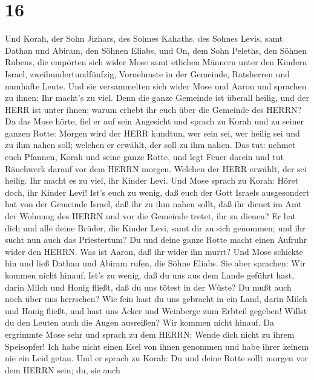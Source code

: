 \hypertarget{section-15}{%
\section{16}\label{section-15}}

 Und Korah, der Sohn Jizhars, des Sohnes Kahaths, des Sohnes
Levis, samt Dathan und Abiram, den Söhnen Eliabs, und On, dem Sohn
Peleths, den Söhnen Rubens,  die empörten sich wider Mose
samt etlichen Männern unter den Kindern Israel, zweihundertundfünfzig,
Vornehmste in der Gemeinde, Ratsherren und namhafte Leute. 
Und sie versammelten sich wider Mose und Aaron und sprachen zu ihnen:
Ihr macht's zu viel. Denn die ganze Gemeinde ist überall heilig, und der
HERR ist unter ihnen; warum erhebt ihr euch über die Gemeinde des HERRN?
 Da das Mose hörte, fiel er auf sein Angesicht 
und sprach zu Korah und zu seiner ganzen Rotte: Morgen wird der HERR
kundtun, wer sein sei, wer heilig sei und zu ihm nahen soll; welchen er
erwählt, der soll zu ihm nahen.  Das tut: nehmet euch
Pfannen, Korah und seine ganze Rotte,  und legt Feuer darein
und tut Räuchwerk darauf vor dem HERRN morgen. Welchen der HERR erwählt,
der sei heilig. Ihr macht es zu viel, ihr Kinder Levi.  Und
Mose sprach zu Korah: Höret doch, ihr Kinder Levi!  Ist's
euch zu wenig, daß euch der Gott Israels ausgesondert hat von der
Gemeinde Israel, daß ihr zu ihm nahen sollt, daß ihr dienet im Amt der
Wohnung des HERRN und vor die Gemeinde tretet, ihr zu dienen?
 Er hat dich und alle deine Brüder, die Kinder Levi, samt
dir zu sich genommen; und ihr sucht nun auch das Priestertum?
 Du und deine ganze Rotte macht einen Aufruhr wider den
HERRN. Was ist Aaron, daß ihr wider ihn murrt?  Und Mose
schickte hin und ließ Dathan und Abiram rufen, die Söhne Eliabs. Sie
aber sprachen: Wir kommen nicht hinauf.  Ist's zu wenig,
daß du uns aus dem Lande geführt hast, darin Milch und Honig fließt, daß
du uns tötest in der Wüste? Du mußt auch noch über uns herrschen?
 Wie fein hast du uns gebracht in ein Land, darin Milch und
Honig fließt, und hast uns Äcker und Weinberge zum Erbteil gegeben!
Willst du den Leuten auch die Augen ausreißen? Wir kommen nicht hinauf.
 Da ergrimmte Mose sehr und sprach zu dem HERRN: Wende dich
nicht zu ihrem Speisopfer! Ich habe nicht einen Esel von ihnen genommen
und habe ihrer keinem nie ein Leid getan.  Und er sprach zu
Korah: Du und deine Rotte sollt morgen vor dem HERRN sein; du, sie auch
